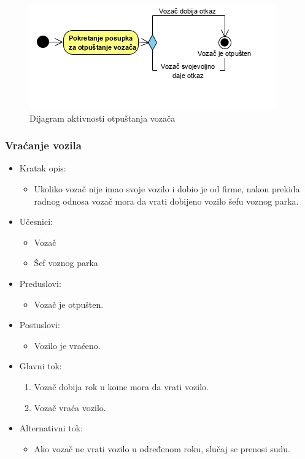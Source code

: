 \begin{figure}[H]
\begin{center}
\includegraphics[scale=1]{Slike/OtpustanjeVozaca.png}
\end{center}
    \caption{Dijagram aktivnosti otpuštanja vozača}
\label{fig:OtpustanjeVozaca}
\end{figure}

\subsubsection{\bfseries Vraćanje vozila}

\begin{itemize}
	\item Kratak opis:
		\begin{itemize}
			\item Ukoliko vozač nije imao svoje vozilo i dobio je od firme, nakon prekida radnog odnosa vozač mora da vrati dobijeno vozilo šefu voznog parka.
		\end{itemize}
	\item Učesnici:
		\begin{itemize}
		    \item Vozač
		    \item Šef voznog parka
		\end{itemize}
	\item Preduslovi:
		\begin{itemize}
		    \item Vozač je otpušten.
		\end{itemize}
	\item Postuslovi:
		\begin{itemize}
			\item Vozilo je vraćeno.
	    \end{itemize}
	\item Glavni tok:
		\begin{enumerate}
		    \item Vozač dobija rok u kome mora da vrati vozilo.
		    \item Vozač vraća vozilo.
		\end{enumerate}
	\item Alternativni tok:
	    \begin{itemize}
	        \item Ako vozač ne vrati vozilo u određenom roku, slučaj se prenosi sudu.
	    \end{itemize}
\end{itemize}

